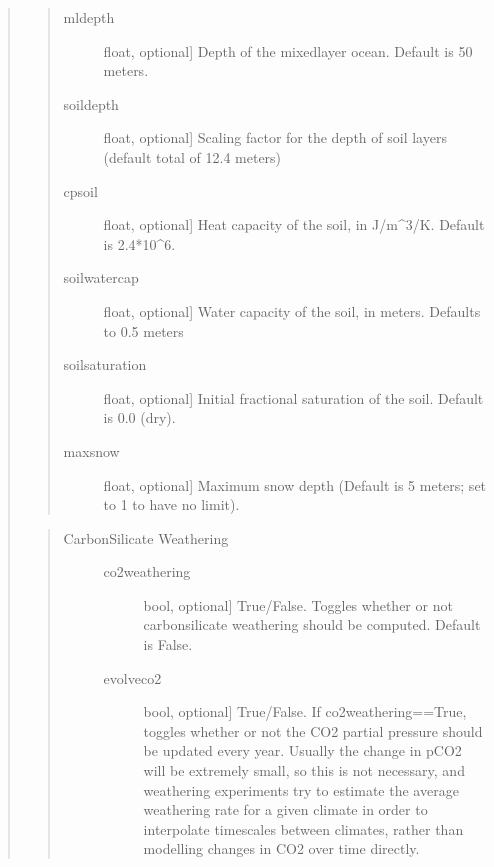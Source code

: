 \documentclass[letterpaper,10pt,english]{sphinxmanual}
\begin{document}
\begin{fulllineitems}
\begin{fulllineitems}
\begin{quote}
\begin{quote}
\begin{description}
\item[{mldepth}] \leavevmode{[}float, optional{]}
Depth of the mixed\sphinxhyphen{}layer ocean. Default is 50 meters.

\item[{soildepth}] \leavevmode{[}float, optional{]}
Scaling factor for the depth of soil layers (default total of 12.4 meters)

\item[{cpsoil}] \leavevmode{[}float, optional{]}
Heat capacity of the soil, in J/m\textasciicircum{}3/K. Default is 2.4*10\textasciicircum{}6.

\item[{soilwatercap}] \leavevmode{[}float, optional{]}
Water capacity of the soil, in meters. Defaults to 0.5 meters

\item[{soilsaturation}] \leavevmode{[}float, optional{]}
Initial fractional saturation of the soil. Default is 0.0 (dry).

\item[{maxsnow}] \leavevmode{[}float, optional{]}
Maximum snow depth (Default is 5 meters; set to \sphinxhyphen{}1 to have no limit).

\end{description}
\end{quote}

\begin{quote}
\begin{description}
\item[{Carbon\sphinxhyphen{}Silicate Weathering}] \leavevmode\begin{description}
\item[{co2weathering}] \leavevmode{[}bool, optional{]}
True/False. Toggles whether or not carbon\sphinxhyphen{}silicate weathering should be
computed. Default is False.

\item[{evolveco2}] \leavevmode{[}bool, optional{]}
True/False. If co2weathering==True, toggles whether or not the CO2 partial
pressure should be updated every year. Usually the change in pCO2 will be
extremely small, so this is not necessary, and weathering experiments try
to estimate the average weathering rate for a given climate in order to
interpolate timescales between climates, rather than modelling changes in CO2
over time directly.


\end{description}
\end{description}
\end{quote}
\end{quote}
\end{fulllineitems}
\end{fulllineitems}
\end{document}

